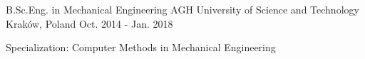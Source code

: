 

\begin{cventries}

  \cventry
    {B.Sc.Eng. in Mechanical Engineering} %
    {AGH University of Science and Technology} %
    {Kraków, Poland} %
    {Oct. 2014 - Jan. 2018} %
    {
      \begin{cvitems} %
        \item {Specialization: Computer Methods in Mechanical Engineering}
      \end{cvitems}
    }

\end{cventries}
